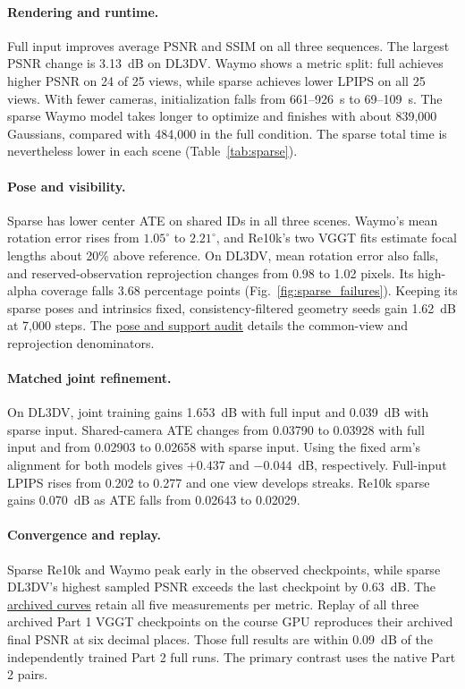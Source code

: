 \ifpartthreeevidence\partthreeassets\fi

\paragraph{Rendering and runtime.}
Full input improves average PSNR and SSIM on all three sequences. The largest PSNR change is 3.13~dB on DL3DV. Waymo shows a metric split: full achieves higher PSNR on 24 of 25 views, while sparse achieves lower LPIPS on all 25 views. With fewer cameras, initialization falls from 661--926~s to 69--109~s. The sparse Waymo model takes longer to optimize and finishes with about 839,000 Gaussians, compared with 484,000 in the full condition. The sparse total time is nevertheless lower in each scene (Table~\ref{tab:sparse}).

\paragraph{Pose and visibility.}
Sparse has lower center ATE on shared IDs in all three scenes. Waymo's mean rotation error rises from $1.05^\circ$ to $2.21^\circ$, and Re10k's two VGGT fits estimate focal lengths about 20\% above reference. On DL3DV, mean rotation error also falls, and reserved-observation reprojection changes from 0.98 to 1.02 pixels. Its high-alpha coverage falls 3.68 percentage points (Fig.~\ref{fig:sparse_failures}). Keeping its sparse poses and intrinsics fixed, consistency-filtered geometry seeds gain 1.62~dB at 7,000 steps. The \href{https://github.com/MoliaiELS/CV_Project4/tree/submission/results/postpre_optimization}{pose and support audit} details the common-view and reprojection denominators.

\paragraph{Matched joint refinement.}
On DL3DV, joint training gains 1.653~dB with full input and 0.039~dB with sparse input. Shared-camera ATE changes from 0.03790 to 0.03928 with full input and from 0.02903 to 0.02658 with sparse input. Using the fixed arm's alignment for both models gives $+0.437$ and $-0.044$~dB, respectively. Full-input LPIPS rises from 0.202 to 0.277 and one view develops streaks. Re10k sparse gains 0.070~dB as ATE falls from 0.02643 to 0.02029.

\paragraph{Convergence and replay.}
Sparse Re10k and Waymo peak early in the observed checkpoints, while sparse DL3DV's highest sampled PSNR exceeds the last checkpoint by 0.63~dB. The \href{https://github.com/MoliaiELS/CV_Project4/blob/submission/results/part2_supplement_v1/figures/convergence_all_metrics.png}{archived curves} retain all five measurements per metric. Replay of all three archived Part 1 VGGT checkpoints on the course GPU reproduces their archived final PSNR at six decimal places. Those full results are within 0.09~dB of the independently trained Part 2 full runs. The primary contrast uses the native Part 2 pairs.

